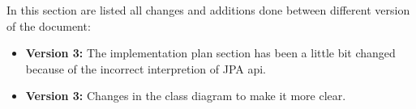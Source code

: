 In this section are listed all changes and additions done between different version of the document:
\begin{itemize}
	\item \textbf{Version 3:} The implementation plan section has been a little bit changed because of the incorrect interpretion of JPA api.
\item \textbf{Version 3:} Changes in the class diagram to make it more clear.
\end{itemize}